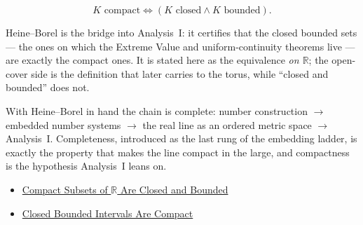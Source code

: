 \begin{remark*}
\[
K \text{ compact} \Longleftrightarrow (K \text{ closed} \land K \text{ bounded}).
\]
\end{remark*}
\begin{remark*}[Interpretation]
Heine--Borel is the bridge into Analysis~I: it certifies that the closed bounded sets --- the ones on which the Extreme Value and uniform-continuity theorems live --- are exactly the compact ones. It is stated here as the equivalence \emph{on $\mathbb{R}$}; the open-cover side is the definition that later carries to the torus, while ``closed and bounded'' does not.
\end{remark*}
\begin{remark*}[Exposition]
With Heine--Borel in hand the chain is complete: number construction $\to$ embedded number systems $\to$ the real line as an ordered metric space $\to$ Analysis~I. Completeness, introduced as the last rung of the embedding ladder, is exactly the property that makes the line compact in the large, and compactness is the hypothesis Analysis~I leans on.
\end{remark*}
\begin{dependencies}
\begin{itemize}
  \item \hyperref[thm:compact-implies-closed-bounded]{Compact Subsets of $\mathbb{R}$ Are Closed and Bounded}
  \item \hyperref[thm:closed-bounded-interval-compact]{Closed Bounded Intervals Are Compact}
\end{itemize}
\end{dependencies}
